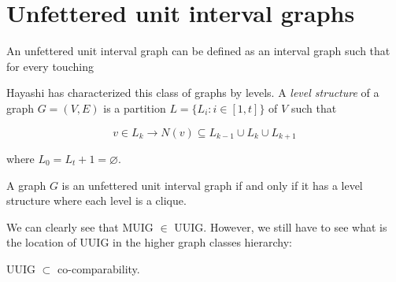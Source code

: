 \section{Unfettered unit interval graphs}
\label{sec:UUIG}

An unfettered unit interval graph can be defined as an interval graph such that for every touching

Hayashi has characterized this class of graphs by levels. A \textit{level structure} of a graph $G = (V,E)$ is a partition $L = \{L_i : i \in [1,t]\}$ of $V$ such that

$$v \in L_k \to N(v) \subseteq L_{k-1} \cup L_{k} \cup L_{k+1}$$

where $L_0 = L_t+1 = \varnothing$.

\begin{theorem}
  \label{theo:uuig_char}
  A graph $G$ is an unfettered unit interval graph if and only if it has a level structure where each level is a clique.
\end{theorem}

We can clearly see that MUIG $\in$ UUIG. However, we still have to see what is the location of UUIG in the higher graph classes hierarchy:

\begin{prop}
  UUIG $\subset$ co-comparability.
\end{prop}

